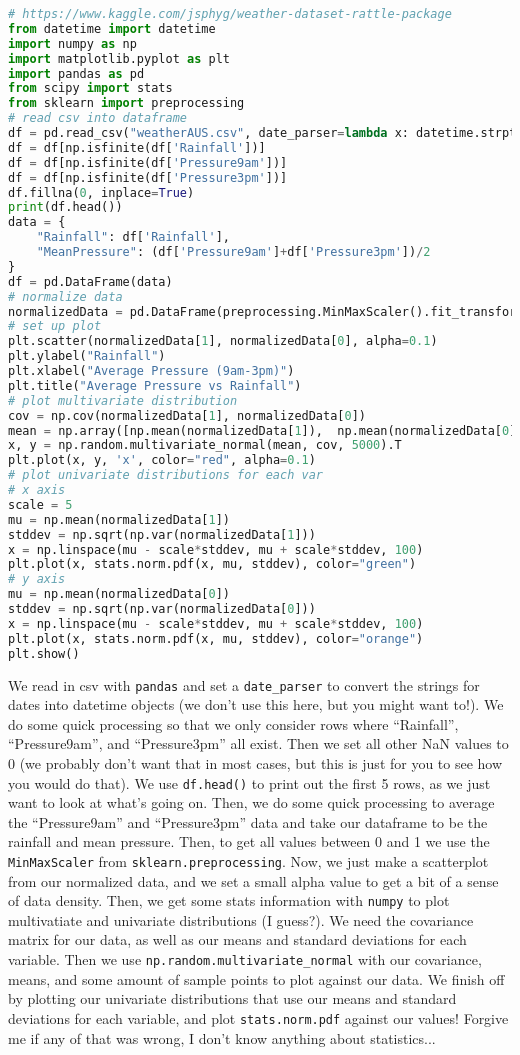 \documentclass[12pt]{article}
\begin{document}
\begin{lstlisting}[language=Python]
# https://www.kaggle.com/jsphyg/weather-dataset-rattle-package
from datetime import datetime
import numpy as np
import matplotlib.pyplot as plt
import pandas as pd
from scipy import stats
from sklearn import preprocessing
# read csv into dataframe
df = pd.read_csv("weatherAUS.csv", date_parser=lambda x: datetime.strptime(x, "%Y-%m-%d"))
df = df[np.isfinite(df['Rainfall'])]
df = df[np.isfinite(df['Pressure9am'])]
df = df[np.isfinite(df['Pressure3pm'])]
df.fillna(0, inplace=True)
print(df.head())
data = {
    "Rainfall": df['Rainfall'], 
    "MeanPressure": (df['Pressure9am']+df['Pressure3pm'])/2
}
df = pd.DataFrame(data)
# normalize data
normalizedData = pd.DataFrame(preprocessing.MinMaxScaler().fit_transform(df))
# set up plot
plt.scatter(normalizedData[1], normalizedData[0], alpha=0.1)
plt.ylabel("Rainfall")
plt.xlabel("Average Pressure (9am-3pm)")
plt.title("Average Pressure vs Rainfall")
# plot multivariate distribution
cov = np.cov(normalizedData[1], normalizedData[0])
mean = np.array([np.mean(normalizedData[1]),  np.mean(normalizedData[0])])
x, y = np.random.multivariate_normal(mean, cov, 5000).T
plt.plot(x, y, 'x', color="red", alpha=0.1)
# plot univariate distributions for each var
# x axis
scale = 5
mu = np.mean(normalizedData[1])
stddev = np.sqrt(np.var(normalizedData[1]))
x = np.linspace(mu - scale*stddev, mu + scale*stddev, 100)
plt.plot(x, stats.norm.pdf(x, mu, stddev), color="green")
# y axis
mu = np.mean(normalizedData[0])
stddev = np.sqrt(np.var(normalizedData[0]))
x = np.linspace(mu - scale*stddev, mu + scale*stddev, 100)
plt.plot(x, stats.norm.pdf(x, mu, stddev), color="orange")
plt.show()
\end{lstlisting}
We read in csv with \texttt{pandas} and set a \texttt{date\_parser} to convert the strings for dates into datetime objects (we don't use this here, but you might want to!). We do some quick processing so that we only consider rows where ``Rainfall'', ``Pressure9am'', and ``Pressure3pm'' all exist. Then we set all other NaN values to 0 (we probably don't want that in most cases, but this is just for you to see how you would do that). We use \texttt{df.head()} to print out the first 5 rows, as we just want to look at what's going on. Then, we do some quick processing to average the ``Pressure9am'' and ``Pressure3pm'' data and take our dataframe to be the rainfall and mean pressure. Then, to get all values between 0 and 1 we use the \texttt{MinMaxScaler} from \texttt{sklearn.preprocessing}. Now, we just make a scatterplot from our normalized data, and we set a small alpha value to get a bit of a sense of data density. Then, we get some stats information with \texttt{numpy} to plot multivatiate and univariate distributions (I guess?). We need the covariance matrix for our data, as well as our means and standard deviations for each variable. Then we use \texttt{np.random.multivariate\_normal} with our covariance, means, and some amount of sample points to plot against our data. We finish off by plotting our univariate distributions that use our means and standard deviations for each variable, and plot \texttt{stats.norm.pdf} against our values! Forgive me if any of that was wrong, I don't know anything about statistics...\\
\end{document}
